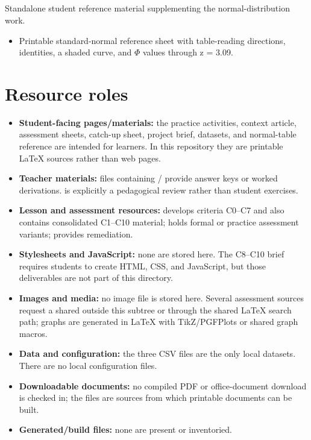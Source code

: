 \subsection{}

Standalone student reference material supplementing the normal-distribution work.

\begin{itemize}
  \item {}

  Printable standard-normal reference sheet with table-reading directions, identities, a shaded curve, and \ensuremath{\Phi} values through z = 3.09.
\end{itemize}

\section{Resource roles}

\begin{itemize}
\item \textbf{Student-facing pages/materials:} the practice activities, context article, assessment sheets, catch-up sheet, project brief, datasets, and normal-table reference are intended for learners. In this repository they are printable LaTeX sources rather than web pages.
\item \textbf{Teacher materials:} files containing / provide answer keys or worked derivations.  is explicitly a pedagogical review rather than student exercises.
\item \textbf{Lesson and assessment resources:}  develops criteria C0–C7 and also contains consolidated C1–C10 material;  holds formal or practice assessment variants;  provides remediation.
\item \textbf{Stylesheets and JavaScript:} none are stored here. The C8–C10 brief requires students to create HTML, CSS, and JavaScript, but those deliverables are not part of this directory.
\item \textbf{Images and media:} no image file is stored here. Several assessment sources request a shared  outside this subtree or through the shared LaTeX search path; graphs are generated in LaTeX with TikZ/PGFPlots or shared graph macros.
\item \textbf{Data and configuration:} the three CSV files are the only local datasets. There are no local configuration files.
\item \textbf{Downloadable documents:} no compiled PDF or office-document download is checked in; the  files are sources from which printable documents can be built.
\item \textbf{Generated/build files:} none are present or inventoried.
\end{itemize}

